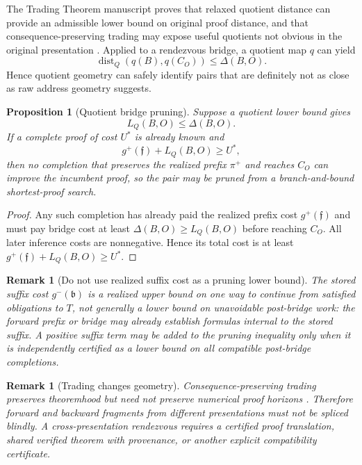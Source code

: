 \documentclass[11pt]{article}
\newtheorem{proposition}[definition]{Proposition}
\newtheorem{remark}[definition]{Remark}
\newcommand{\dist}{\operatorname{dist}}
\begin{document}
The Trading Theorem manuscript proves that relaxed quotient distance can provide an admissible lower bound on original proof distance, and that consequence-preserving trading may expose useful quotients not obvious in the original presentation \cite{Trading}. Applied to a rendezvous bridge, a quotient map $q$ can yield
\[
\dist_Q(q(B),q(C_O))\le \Delta(B,O).
\]
Hence quotient geometry can safely identify pairs that are definitely not as close as raw address geometry suggests.

\begin{proposition}[Quotient bridge pruning]
Suppose a quotient lower bound gives
\[
L_Q(B,O)\le\Delta(B,O).
\]
If a complete proof of cost $U^*$ is already known and
\[
g^+(\mathfrak f)+L_Q(B,O)\ge U^*,
\]
then no completion that preserves the realized prefix $\pi^+$ and reaches $C_O$ can improve the incumbent proof, so the pair may be pruned from a branch-and-bound shortest-proof search.
\end{proposition}

\begin{proof}
Any such completion has already paid the realized prefix cost $g^+(\mathfrak f)$ and must pay bridge cost at least $\Delta(B,O)\ge L_Q(B,O)$ before reaching $C_O$. All later inference costs are nonnegative. Hence its total cost is at least $g^+(\mathfrak f)+L_Q(B,O)\ge U^*$.
\end{proof}

\begin{remark}[Do not use realized suffix cost as a pruning lower bound]
The stored suffix cost $g^-(\mathfrak b)$ is a realized \emph{upper} bound on one way to continue from satisfied obligations to $T$, not generally a lower bound on unavoidable post-bridge work: the forward prefix or bridge may already establish formulas internal to the stored suffix. A positive suffix term may be added to the pruning inequality only when it is independently certified as a lower bound on all compatible post-bridge completions.
\end{remark}

\begin{remark}[Trading changes geometry]
Consequence-preserving trading preserves theoremhood but need not preserve numerical proof horizons \cite{Trading}. Therefore forward and backward fragments from different presentations must not be spliced blindly. A cross-presentation rendezvous requires a certified proof translation, shared verified theorem with provenance, or another explicit compatibility certificate.
\end{remark}
\end{document}
